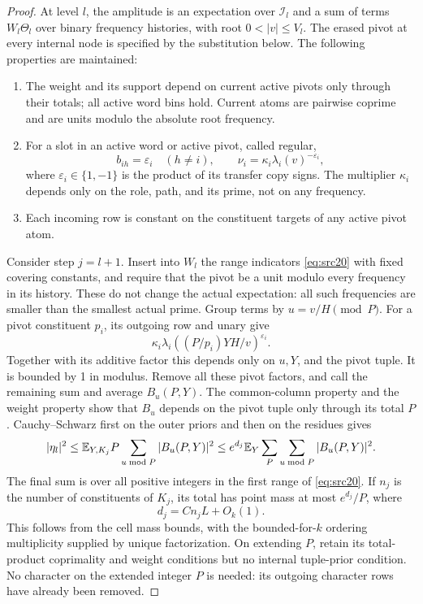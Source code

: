 \begin{proof}
At level \(l\), the amplitude is an expectation over
\(\mathcal I_l\) and a sum of terms \(W_l\Theta_l\) over binary
frequency histories, with root \(0<|v|\le V_l\).
The erased pivot at every internal node is specified by the
substitution below. The following properties are maintained:
\begin{enumerate}[label=(\roman*)]
\item
The weight and its support depend on current active pivots only
through their totals; all active word bins hold. Current atoms
are pairwise coprime and are units modulo the absolute root
frequency.
\item
For a slot in an active word or active pivot, called regular,
\[
 b_{ih}=\varepsilon_i\quad(h\ne i),\qquad
 \nu_i=\kappa_i\lambda_i(v)^{-\varepsilon_i},
\]
where \(\varepsilon_i\in\{1,-1\}\) is the product of its transfer
copy signs. The multiplier \(\kappa_i\) depends only on the
role, path, and its prime, not on any frequency.
\item
Each incoming row is constant on the constituent targets of any
active pivot atom.
\end{enumerate}

Consider step \(j=l+1\). Insert into \(W_l\) the range indicators
\eqref{eq:src20} with fixed covering constants, and require that
the pivot be a unit modulo every frequency in its history.
These do not change the actual expectation: all such frequencies
are smaller than the smallest actual prime. Group terms by
\(u=v/H\pmod P\). For a pivot constituent \(p_i\), its outgoing
row and unary give
\[
 \kappa_i
 \lambda_i\!\left((P/p_i)YH/v\right)^{\varepsilon_i}.
\]
Together with its additive factor this depends only on
\(u,Y\), and the pivot tuple. It is bounded by 1 in modulus.
Remove all these pivot factors, and call the remaining
sum and average \(B_u(P,Y)\). The common-column property and
the weight property show that \(B_u\) depends on the pivot
tuple only through its total \(P\). Cauchy--Schwarz first on
the outer priors and then on the residues gives
\begin{equation}\label{eq:src22}
 |\eta_l|^2
 \le \mathbb E_{Y,K_j}P\sum_{u\bmod P}|B_u(P,Y)|^2
 \le e^{d_j}\mathbb E_Y\sum_P\sum_{u\bmod P}|B_u(P,Y)|^2.
\end{equation}
The final sum is over all positive integers in the first range
of \eqref{eq:src20}. If \(n_j\) is the number of constituents
of \(K_j\), its total has point mass at most
\(e^{d_j}/P\), where
\[
 d_j=Cn_jL+O_k(1).
\]
This follows from the cell mass bounds, with the bounded-for-\(k\)
ordering multiplicity supplied by unique factorization.
On extending \(P\), retain its total-product coprimality and
weight conditions but no internal tuple-prior condition.
No character on the extended integer \(P\) is needed: its
outgoing character rows have already been removed.


\end{proof}
